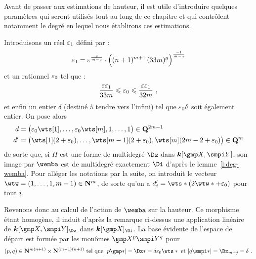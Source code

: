 Avant de passer aux estimations de hauteur, il est utile d'introduire quelques
paramètres qui seront utilisés tout au long de ce chapitre et qui contrôlent
notamment le degré en lequel nous établirons ces estimations.

Introduisons un réel \( \varepsilon\sb1 \) défini par :
\begin{equation} \label{e:def-epsi}
  \varepsilon\sb1 =
  \varepsilon^{\frac{g}{m-g}}
  \cdot \Bigl(
    (n + 1)^{m+1}
    \, (33m)^g
  \Bigr)^{\frac{-1}{m-g}}
\end{equation}
et un rationnel \( \varepsilon\sb0 \) tel que :
\begin{equation} \label{e:def-epsz}
  \frac{\varepsilon \varepsilon\sb1}{33m}
  \leqslant \varepsilon\sb0 \leqslant
  \frac{\varepsilon \varepsilon\sb1}{32m}
  \text{ ,}
\end{equation}
et enfin un entier \( \delta \) (destiné à tendre vers l'infini) tel que \(
  \varepsilon\sb0 \delta \) soit également entier. On pose alors
\begin{equation} \label{e:d-dp-def}
  \begin{aligned}
    d & = \bigl(
      \epsz \wts[1],
      \dots,
      \epsz \wts[\puiss],
      1, \dots, 1
    \bigr) \in \Q^{2\puiss-1}
    \\
    d' & = \bigl(
      \wts[1] (2 + \epsz),
      \dots,
      \wts[\puiss-1] (2 + \epsz),
      \wts[\puiss] (2\puiss - 2 + \epsz)
    \bigr) \in \Q^\puiss
  \end{aligned}
\end{equation}
de sorte que, si \( H \) est une forme de multidegré \( \Dz \) dans \(
  \cdn[\vmp, \vmpi] \), son image par \( \wemba \) est de multidegré
exactement \( \Di \) d'après le lemme~\ref{l:deg-wemba}. Pour alléger les
notations par la suite, on introduit le vecteur \( \wtw = (1, \dots, 1, \puiss
  - 1) \in \N^\puiss \), de sorte qu'on a \( d'_\fct = \wts* (2 \wtw* + \epsz)
\) pour tout \( i \).

\medskip

Revenons donc au calcul de l'action de \( \wemba \) sur la hauteur. Ce
morphisme étant homogène, il induit d'après la remarque ci-dessus une
application linéaire de \( \cdn [\vmp, \vmpi]_\Dz \) dans \( \cdn [\vmp]_\Di
\).  La base évidente de l'espace de départ est formée par les monômes \(
  \vmp^p \vmpi^q \) pour
\begin{equation}
  (p, q)
  \in \N^{\puiss (\dimp+1)} \times \N^{(\puiss-1) (\dimp+1)}
  \text{ tel que }
  \lgr{p\mexp*} = \Dz* = \delta \epsz \wts*
  \text{ et }
  \lgr{q\mexpi*} = \Dz_{\puiss + \fcti} = \delta
  \pmm.
\end{equation}

